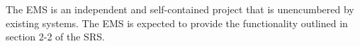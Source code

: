 The EMS is an independent and self-contained project that is unencumbered by existing systems. The EMS is expected to provide the functionality outlined in section 2-2 of the SRS.